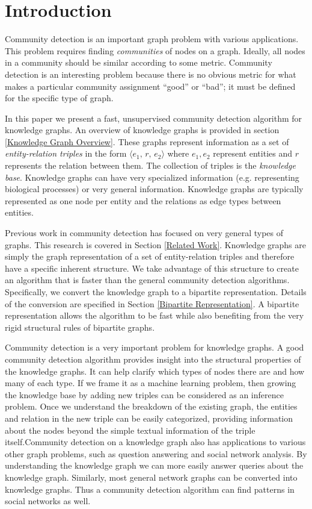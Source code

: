 \documentclass[12pt]{article}
\begin{document}
\section{Introduction}
\label{Introduction}

Community detection is an important graph problem with various applications.
This problem requires finding \textit{communities} of nodes on a graph. Ideally,
all nodes in a community should be similar according to some metric. Community
detection is an interesting problem because there is no obvious metric for
what makes a particular community assignment ``good'' or ``bad''; it must be
defined for the specific type of graph.

In this paper we present a fast, unsupervised community detection algorithm for
knowledge graphs. An overview of knowledge graphs is provided in section
\ref{Knowledge Graph Overview}. These graphs represent information as a set of
\textit{entity-relation triples} in the form $\langle e_1,\,r,\,e_2 \rangle$ where
$e_1,e_2$ represent entities and $r$ represents the relation between them. The
collection of triples is the \textit{knowledge base}. Knowledge graphs can have
very specialized information (e.g. representing biological processes) or very
general information. Knowledge graphs are typically represented as one node per
entity and the relations as edge types between entities.

Previous work in community detection has focused on very general types of
graphs. This research is covered in Section \ref{Related Work}. Knowledge graphs
are simply the graph representation of a set of entity-relation triples and
therefore have a specific inherent structure. We take advantage of this
structure to create an algorithm that is faster than the general community
detection algorithms. Specifically, we convert the knowledge graph to a
bipartite representation. Details of the conversion are specified in Section
\ref{Bipartite Representation}. A bipartite representation allows the algorithm
to be fast while also benefiting from the very rigid structural rules of
bipartite graphs.

Community detection is a very important problem for knowledge graphs. A good
community detection algorithm provides insight into the structural properties of
the knowledge graphs. It can help clarify which types of nodes there are and how
many of each type. If we frame it as a machine learning problem, then growing
the knowledge base by adding new triples can be considered as an inference
problem. Once we understand the breakdown of the existing graph, the entities
and relation in the new triple can be easily categorized, providing information
about the nodes beyond the simple textual information of the triple
itself.Community detection on a knowledge graph also has applications to various
other graph problems, such as question answering and social network analysis. By
understanding the knowledge graph we can more easily answer queries about the
knowledge graph. Similarly, most general network graphs can be converted into
knowledge graphs. Thus a community detection algorithm can find patterns in
social networks as well.
\end{document}
